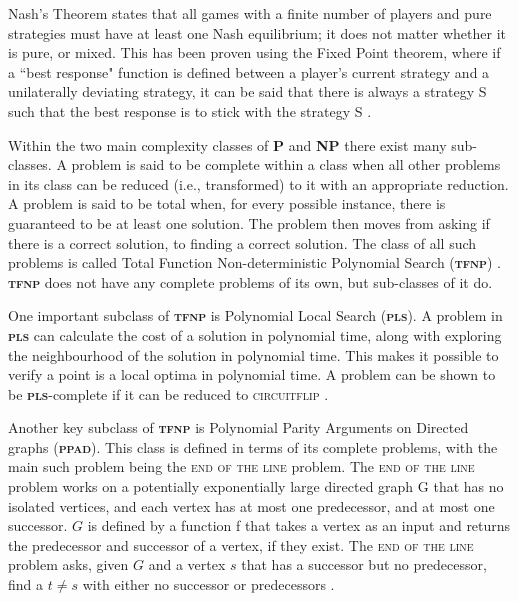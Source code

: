 \documentclass{article}
\begin{document}
\begin{multicols}{2}
Nash’s Theorem states that all games with a finite number of players and pure strategies must have at least one Nash equilibrium; it does not matter whether it is pure, or mixed. This has been proven using the Fixed Point theorem, where if a ``best response" function is defined between a player’s current strategy and a unilaterally deviating strategy, it can be said that there is always a strategy S such that the best response is to stick with the strategy S \cite{NashJohnF..1950}.

Within the two main complexity classes of \textbf{\textsc{P}} and \textbf{\textsc{NP}} there exist many sub-classes. A problem is said to be complete within a class when all other problems in its class can be reduced (i.e., transformed) to it with an appropriate reduction. A problem is said to be total when, for every possible instance, there is guaranteed to be at least one solution. The problem then moves from asking if there is a correct solution, to finding a correct solution. The class of all such problems is called Total Function Non-deterministic Polynomial Search (\textbf{\textsc{tfnp}}) \cite{Wigderson.2019}. \textbf{\textsc{tfnp}} does not have any complete problems of its own, but sub-classes of it do.

One important subclass of \textbf{\textsc{tfnp}} is Polynomial Local Search (\textbf{\textsc{pls}}). A problem in \textbf{\textsc{pls}} can calculate the cost of a solution in polynomial time, along with exploring the neighbourhood of the solution in polynomial time. This makes it possible to verify a point is a local optima in polynomial time. A problem can be shown to be \textbf{\textsc{pls}}-complete if it can be reduced to \textsc{circuitflip} \cite{Borzechowski.19thSeptember2016}.

Another key subclass of \textbf{\textsc{tfnp}} is Polynomial Parity Arguments on Directed graphs (\textbf{\textsc{ppad}}). This class is defined in terms of its complete problems, with the main such problem being the \textsc{end of the line} problem. The \textsc{end of the line} problem works on a potentially exponentially large directed graph G that has no isolated vertices, and each vertex has at most one predecessor, and at most one successor. $G$ is defined by a function f that takes a vertex as an input and returns the predecessor and successor of a vertex, if they exist. The \textsc{end of the line} problem asks, given $G$ and a vertex $s$ that has a successor but no predecessor, find a $t \neq s$ with either no successor or predecessors \cite{PapadimitriouChristosH..}.




\end{multicols}
\end{document}
